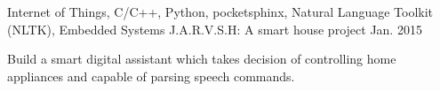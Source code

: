 \begin{cventries}
    \cventry
    {Internet of Things, C/C++, Python, pocketsphinx, Natural Language Toolkit (NLTK), Embedded Systems}
    {J.A.R.V.S.H: A smart house project}
    {}
    {Jan. 2015}
    {
      \begin{cvitems}
        \item {Build a smart digital assistant which takes decision of controlling home appliances and capable of parsing speech commands.}
      \end{cvitems}
    }
    
\end{cventries}
